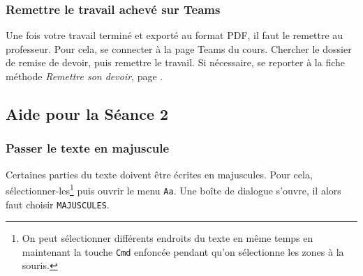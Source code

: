 \subsubsection{Remettre le travail achevé sur Teams}

Une fois votre travail terminé et exporté au format PDF, il faut le remettre au professeur. Pour cela, se connecter à la page Teams du cours. Chercher le dossier de remise de devoir, puis remettre le travail. Si nécessaire, se reporter à la fiche méthode \emph{Remettre son devoir}, page \pageref{TeamsRemettreDevoir}.  








%
%



%
%
%
%


\subsection{Aide pour la Séance 2}\label{correction_texte02}


\subsubsection{Passer le texte en majuscule}

Certaines parties du texte doivent être écrites en majuscules. Pour cela, sélectionner-les\footnote{On peut sélectionner différents endroits du texte en même temps en maintenant la touche \texttt{Cmd} enfoncée pendant qu'on sélectionne les zones à la souris.} puis ouvrir le menu \texttt{Aa}. Une boîte de dialogue s'ouvre, il alors faut choisir \texttt{MAJUSCULES}.  










